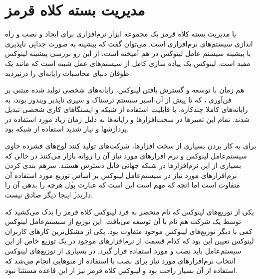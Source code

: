 %
% 
% 
% 
%
\section{مدیریت بسته کلاه قرمز}


 یا مدیریت بسته کلاه قرمز یک
مجموعه ابزار نرم‌افزاری برای ایجاد و نصب و راه اندازی سیستم‌های نرم‌افزاری است. می‌توان
گفت که پیشینه  به صورت جدایی ناپذیری با پیشینه سیستم عامل لینوکس در هم
آمیخته است، از این رو بررسی پیشینه‌ لینوکس مفید است. لینوکس یک پیاده سازی کامل
از سیستم‌های عمل شبیه  است که مانند یک طوفان دنیای محاسبات رایانه‌ای را
درنبردید.

هم زمان با توسعه و گسترش یافتن لینوکس، رایانه‌های شخصی تولید شده مبتنی بر
فن‌آوری ، که تا پیش از آن اسیر سیستم ترسناک و سیری ناپذیر ویندوز بوند،
به رایانه‌های کاملا چندکاره، با قابلیت استفاده
از شبکه و ایستگاهای کاری شخصی تبدیل شدند. تمام این تعییرها در سخت‌افزارها و
رایانه‌ها به دلیل زمان زیاد مورد استفاده در پردازشها و نیاز شدید استفاده از شبکه
بود.

برای به کار بردن بسیاری از سخت افزارها، شرکت‌های تولید کنند لوح‌های فشرده حاوی
سیستم‌عامل لینوکس و نرم افزارهای مورد نیاز آن را روانه بازار می‌کنند در حالی که
بسیاری از این نرم‌افزارها در شبکه جهانی قابل دسترس هستند.
سرهم بندی کردن نرم‌افزارهای مورد نیاز در سیستم‌عامل لینوکس بر اساس توزیع مورد
استفاده آن متفاوت است اما انچه که مهم است این است که عبارت \'پول هرچه را بدهی
آن را داری\' در اینجا دیگر صادق نیست.

یکی از توزیع‌های لینوکس که نام منحصر به فرد لینوکس کلاه قرمز را یدک می‌کشید که توسط یک شرکت هم نام با آن توسعه می‌یافت. این توزیع
از سیستم‌عامل لینوکس کمی با دیگر توزیع‌های لینوکس موجود متفاوت بود. یکی از
مشکل‌ترین کارهای کاربران لینوکس تعیین این بود که کدام قسمت از نرم‌افزارهای موجود
در یک توزیع خاص از این سیستم‌عامل باید نصب و مورد استفاده قرار گیرد. در بسیاری
از توزیع‌های لینوکس انتخاب نرم‌افزارهای مورد نیاز برای نصب با استفاده از منوهایی
انجام می‌شد که استفاده از آن بسیار راحت بود و لینوکس کلاه قرمز نیز از این قاعده
مستثنا نبود.

